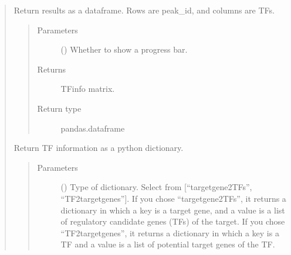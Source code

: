 \documentclass[letterpaper,10pt,english]{sphinxmanual}
\begin{document}
\begin{quote}
\begin{fulllineitems}
\begin{fulllineitems}
\begin{quote}
\begin{description}
\begin{itemize}
\end{itemize}

\end{description}\end{quote}

\end{fulllineitems}


\begin{fulllineitems}
\label{\detokenize{modules/celloracle.motif_analysis:celloracle.motif_analysis.TFinfo.to_dataframe}}
Return results as a dataframe.
Rows are peak\_id, and columns are TFs.
\begin{quote}\begin{description}
\item[{Parameters}] \leavevmode
{} () \textendash{} Whether to show a progress bar.

\item[{Returns}] \leavevmode
TFinfo matrix.

\item[{Return type}] \leavevmode
pandas.dataframe

\end{description}\end{quote}

\end{fulllineitems}


\begin{fulllineitems}
\label{\detokenize{modules/celloracle.motif_analysis:celloracle.motif_analysis.TFinfo.to_dictionary}}
Return TF information as a python dictionary.
\begin{quote}\begin{description}
\item[{Parameters}] \leavevmode
{} () \textendash{} Type of dictionary. Select from {[}“targetgene2TFs”, “TF2targetgenes”{]}.
If you chose “targetgene2TFs”, it returns a dictionary in which a key is a target gene, and a value is a list of regulatory candidate genes (TFs) of the target.
If you chose “TF2targetgenes”, it returns a dictionary in which a key is a TF and a value is a list of potential target genes of the TF.


\end{description}
\end{quote}
\end{fulllineitems}
\end{fulllineitems}
\end{quote}
\end{document}
